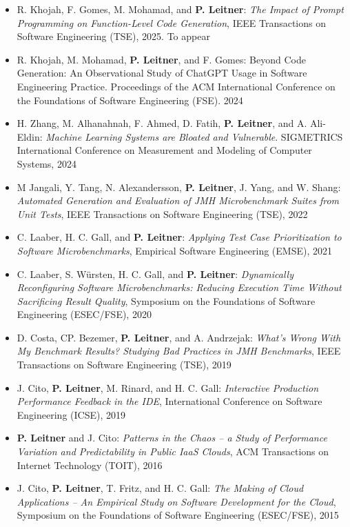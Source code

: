 \documentclass[paper=letter,fontsize=11pt]{scrartcl} %
\begin{document}
\begin{itemize}
	\item R. Khojah, F. Gomes, M. Mohamad, and  \textbf{P. Leitner}: \emph{The Impact of Prompt Programming on Function-Level Code Generation}, IEEE Transactions on Software Engineering (TSE), 2025. To appear
	\item  R. Khojah, M. Mohamad, \textbf{P. Leitner}, and F. Gomes: Beyond Code Generation: An Observational Study of ChatGPT Usage in Software Engineering Practice. Proceedings of the ACM International Conference on the Foundations of Software Engineering (FSE). 2024  	
	\item H. Zhang, M. Alhanahnah, F. Ahmed, D. Fatih, \textbf{P. Leitner}, and A. Ali-Eldin: 
	\emph{Machine Learning Systems are Bloated and Vulnerable}. SIGMETRICS International Conference on Measurement and Modeling of Computer Systems, 2024
	\item M Jangali, Y. Tang, N. Alexandersson, \textbf{P. Leitner}, J. Yang, and W. Shang: \emph{Automated Generation and Evaluation of JMH Microbenchmark Suites from Unit Tests}, IEEE Transactions on Software Engineering (TSE), 2022
	\item C. Laaber, H. C. Gall, and \textbf{P. Leitner}: \emph{Applying Test Case Prioritization to Software Microbenchmarks}, Empirical Software Engineering (EMSE), 2021
\item C. Laaber,  S. W\"ursten, H. C. Gall, and \textbf{P. Leitner}: \emph{Dynamically Reconfiguring Software Microbenchmarks: Reducing Execution Time Without Sacrificing Result Quality}, Symposium on the Foundations of Software Engineering (ESEC/FSE), 2020 
	\item D. Costa, CP. Bezemer, \textbf{P. Leitner}, and  A. Andrzejak: \emph{What's Wrong With My Benchmark Results? Studying Bad Practices in JMH Benchmarks}, IEEE Transactions on Software Engineering (TSE), 2019
	\item J. Cito, \textbf{P. Leitner}, M. Rinard, and H. C. Gall: \emph{Interactive Production Performance Feedback in the IDE}, International Conference on Software Engineering (ICSE),  2019
  \item  \textbf{P. Leitner} and J. Cito: \emph{Patterns in the Chaos -- a Study of Performance Variation and Predictability in Public IaaS Clouds}, ACM Transactions on Internet Technology (TOIT), 2016
        \item J. Cito, \textbf{P. Leitner}, T. Fritz, and H. C. Gall: \emph{The Making of Cloud Applications -- An Empirical Study on Software Development for the Cloud}, Symposium on the Foundations of Software Engineering (ESEC/FSE), 2015
\end{itemize}
\end{document}
